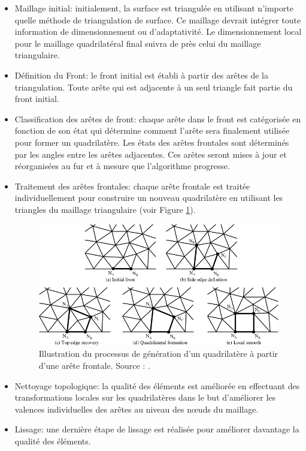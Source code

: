 \begin{itemize}
    \item Maillage initial: initialement, la surface est triangulée en utilisant n'importe quelle méthode de triangulation de surface. Ce maillage devrait intégrer toute information de dimensionnement ou d'adaptativité. Le dimensionnement local pour le maillage quadrilatéral final suivra de près celui du maillage triangulaire.\\

    \item Définition du Front: le front initial est établi à partir des arêtes de la triangulation. Toute arête qui est adjacente à un seul triangle fait partie du front initial.\\

    \item Classification des arêtes de front: chaque arête dans le front est catégorisée en fonction de son état qui détermine comment l'arête sera finalement utilisée pour former un quadrilatère. Les états des arêtes frontales sont déterminés par les angles entre les arêtes adjacentes. Ces arêtes seront mises à jour et réorganisées au fur et à mesure que l'algorithme progresse.\\

    \item Traitement des arêtes frontales: chaque arête frontale est traitée individuellement pour construire un nouveau quadrilatère en utilisant les triangles du maillage triangulaire (voir Figure \ref{fig:step_front_advancing}).

    \begin{figure}[!h]
    \centering
    \includegraphics[scale=0.6]{images/step_front_advancing.png}
    \caption{Illustration du processus de génération d'un quadrilatère à partir d'une arête frontale. Source : \cite{owen1999q}.}
    \label{fig:step_front_advancing}
    \end{figure}

    \item Nettoyage topologique: la qualité des éléments est améliorée en effectuant des transformations locales sur les quadrilatères dans le but d'améliorer les valences individuelles des arêtes au niveau des nœuds du maillage.\\

    \item Lissage: une dernière étape de lissage est réalisée pour améliorer davantage la qualité des éléments.\\
\end{itemize}


